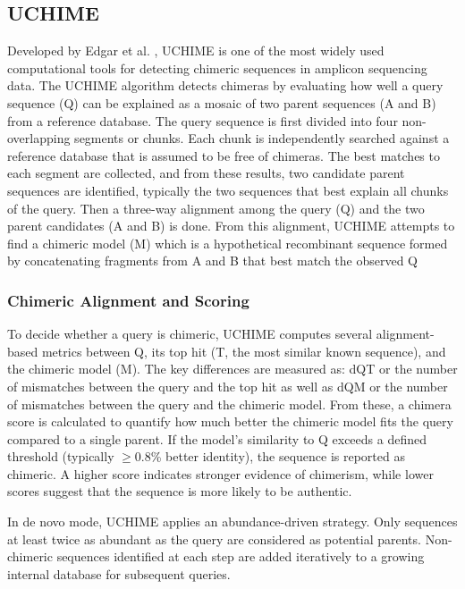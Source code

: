 \subsection{UCHIME}
Developed by Edgar et al. \citep{Edgar2011}, UCHIME is one of the most widely used computational tools for detecting chimeric sequences in amplicon sequencing data. The UCHIME algorithm detects chimeras by evaluating how well a query sequence (Q) can be explained as a mosaic of two parent sequences (A and B) from a reference database. The query sequence is first divided into four non-overlapping segments or chunks. Each chunk is independently searched against a reference database that is assumed to be free of chimeras. The best matches to each segment are collected, and from these results, two candidate parent sequences are identified, typically the two sequences that best explain all chunks of the query. Then a three-way alignment among the query (Q) and the two parent candidates (A and B) is done. From this alignment, UCHIME attempts to find a chimeric model (M) which is a hypothetical recombinant sequence formed by concatenating fragments from A and B that best match the observed Q

\subsubsection{Chimeric Alignment and Scoring}  
To decide whether a query is chimeric, UCHIME computes several alignment-based metrics between Q, its top hit (T, the most similar known sequence), and the chimeric model (M). The key differences are measured as: dQT or the number of mismatches between the query and the top hit as well as dQM or the number of mismatches between the query and the chimeric model. From these, a chimera score is calculated to quantify how much better the chimeric model fits the query compared to a single parent. If the model’s similarity to Q exceeds a defined threshold (typically $\ge$0.8\% better identity), the sequence is reported as chimeric. A higher score indicates stronger evidence of chimerism, while lower scores suggest that the sequence is more likely to be authentic.

In de novo mode, UCHIME applies an abundance-driven strategy. Only sequences at least twice as abundant as the query are considered as potential parents. Non-chimeric sequences identified at each step are added iteratively to a growing internal database for subsequent queries.

